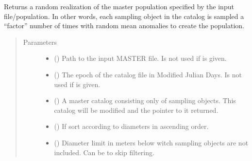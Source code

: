 \documentclass[letterpaper,10pt,english]{sphinxmanual}
\begin{document}

\begin{fulllineitems}
\label{\detokenize{modules/population_library:population_library.master_catalog_factor}}
Returns a random realization of the master population specified by the input file/population. In other words, each sampling object in the catalog is sampled a “factor” number of times with random mean anomalies to create the population.
\begin{quote}\begin{description}
\item[{Parameters}] \leavevmode\begin{itemize}
\item {} 
 () \textendash{} Path to the input MASTER file. Is not used if  is given.

\item {} 
 () \textendash{} The epoch of the catalog file in Modified Julian Days. Is not used if  is given.

\item {} 
 ({\hyperref[\detokenize{modules/population:population.Population}]{}}) \textendash{} A master catalog consisting only of sampling objects. This catalog will be modified and the pointer to it returned.

\item {} 
 () \textendash{} If  sort according to diameters in ascending order.

\item {} 
 () \textendash{} Diameter limit in meters below witch sampling objects are not included. Can be  to skip filtering.


\end{itemize}
\end{description}
\end{quote}
\end{fulllineitems}
\end{document}
